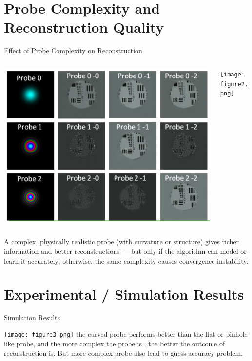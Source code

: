 \documentclass[15pt]{beamer}
\begin{document}
\section{Probe Complexity and Reconstruction Quality}
\begin{frame}{Effect of Probe Complexity on Reconstruction}

\begin{columns}[T,onlytextwidth]
\begin{column}{0.55\textwidth}

\includegraphics[width=0.7\linewidth]{Probes.png}
\end{column}

\begin{column}{0.45\textwidth}
\centering

\texttt{[image: figure2.png]}


\end{column}
\end{columns}
A complex, physically realistic probe (with curvature or structure) gives richer information and better reconstructions — but only if the algorithm can model or learn it accurately; otherwise, the same complexity causes convergence instability.
\end{frame}



\section{Experimental / Simulation Results}
\begin{frame}{Simulation Results}

    \centering
    \texttt{[image: figure3.png]}
    the curved probe performs better than the flat or pinhole like probe, and the more complex the probe is , the better the outcome of reconstruction is. But more complex probe also lead to guess accuracy problem.
\end{frame}
\end{document}
